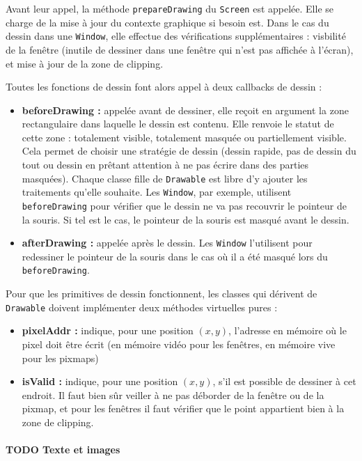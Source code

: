 Avant leur appel, la méthode \verb|prepareDrawing| du \verb|Screen| est appelée. Elle se charge de la mise à jour du contexte graphique si besoin est. Dans le cas du dessin dans une \verb|Window|, elle effectue des vérifications supplémentaires : visbilité de la fenêtre (inutile de dessiner dans une fenêtre qui n'est pas affichée à l'écran), et mise à jour de la zone de clipping.

Toutes les fonctions de dessin font alors appel à deux callbacks de dessin :
\begin{itemize}
  \item \textbf{beforeDrawing :} appelée avant de dessiner, elle reçoit en argument la zone rectangulaire dans laquelle le dessin est contenu. Elle renvoie le statut de cette zone : totalement visible, totalement masquée ou partiellement visible. Cela permet de choisir une stratégie de dessin (dessin rapide, pas de dessin du tout ou dessin en prêtant attention à ne pas écrire dans des parties masquées). Chaque classe fille de \verb|Drawable| est libre d'y ajouter les traitements qu'elle souhaite. Les \verb|Window|, par exemple, utilisent \verb|beforeDrawing| pour vérifier que le dessin ne va pas recouvrir le pointeur de la souris. Si tel est le cas, le pointeur de la souris est masqué avant le dessin.
  \item \textbf{afterDrawing :} appelée après le dessin. Les \verb|Window| l'utilisent pour redessiner le pointeur de la souris dans le cas où il a été masqué lors du \verb|beforeDrawing|.
\end{itemize}

\vspace{1em}

Pour que les primitives de dessin fonctionnent, les classes qui dérivent de \verb|Drawable| doivent implémenter deux méthodes virtuelles pures :
\begin{itemize}
  \item \textbf{pixelAddr :} indique, pour une position $(x, y)$, l'adresse en mémoire où le pixel doit être écrit (en mémoire vidéo pour les fenêtres, en mémoire vive pour les pixmaps)
  \item \textbf{isValid :} indique, pour une position $(x, y)$, s'il est possible de dessiner à cet endroit. Il faut bien sûr veiller à ne pas déborder de la fenêtre ou de la pixmap, et pour les fenêtres il faut vérifier que le point appartient bien à la zone de clipping.
\end{itemize}

\paragraph{TODO Texte et images}

